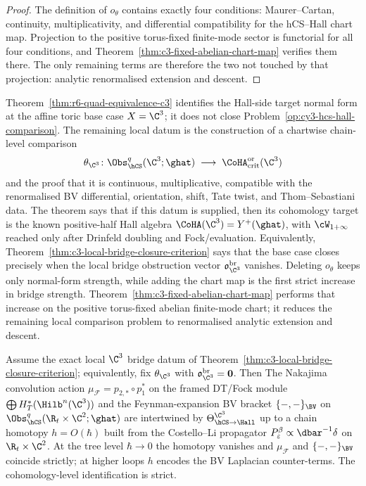 \begin{proof}
The definition of $o_\theta$ contains exactly four conditions:
Maurer--Cartan, continuity, multiplicativity, and differential
compatibility for the hCS--Hall chart map. Projection to the positive
torus-fixed finite-mode sector is functorial for all four conditions,
and Theorem~\ref{thm:c3-fixed-abelian-chart-map} verifies them there.
The only remaining terms are therefore the two not touched by that
projection: analytic renormalised extension and descent.
\end{proof}

\begin{remark}
\label{rem:r6-op-closed-at-c3}
Theorem~\ref{thm:r6-quad-equivalence-c3} identifies the Hall-side target
normal form at the affine toric base case $X=\C^3$; it does not close
Problem~\ref{op:cy3-hcs-hall-comparison}. The remaining local datum is
the construction of a chartwise chain-level comparison
\[
\theta_{\C^3}\colon
\Obs_{\hCS}^{q}(\C^3;\ghat)
\;\longrightarrow\;
\CoHA_{\mathrm{crit}}^{\mathrm{or}}(\C^3)
\]
and the proof that it is continuous, multiplicative, compatible with the
renormalised BV differential, orientation, shift, Tate twist, and
Thom--Sebastiani data. The theorem says that if this datum is supplied,
then its cohomology target is the known positive-half Hall algebra
$\CoHA(\C^3)=Y^+(\ghat)$, with $\cW_{1+\infty}$ reached only after
Drinfeld doubling and Fock/evaluation. Equivalently,
Theorem~\ref{thm:c3-local-bridge-closure-criterion} says that the base
case closes precisely when the local bridge obstruction vector
$\mathfrak o_{\C^3}^{\mathrm{br}}$ vanishes. Deleting \(o_{\theta}\)
keeps only normal-form strength, while
adding the chart map is the first strict increase in bridge strength.
Theorem~\ref{thm:c3-fixed-abelian-chart-map} performs that increase on
the positive torus-fixed abelian finite-mode chart; it reduces the
remaining local comparison problem to renormalised analytic extension
and descent.
\end{remark}

\begin{proposition}
\label{prop:r6-convolution-vs-bv-bracket}
Assume the exact local $\C^3$ bridge datum of
Theorem~\ref{thm:c3-local-bridge-closure-criterion}; equivalently, fix
$\theta_{\C^3}$ with
$\mathfrak o_{\C^3}^{\mathrm{br}}=\mathbf 0$. Then
The Nakajima convolution action
$\mu_{\mathcal F}=p_{2,*}\circ p_1^*$ on the framed DT/Fock module
$\bigoplus H^*_T(\Hilb^n(\C^3))$
and the Feynman-expansion BV bracket
$\{-,-\}_{\BV}$ on $\Obs_{\hCS}^{q}(\R_t\times\C^2;\ghat)$ are
intertwined by $\Theta^{\C^3}_{\hCS\to\Hall}$ up to a chain homotopy
$h=O(\hbar)$ built from the Costello--Li propagator
$P^\beta_\varepsilon\propto\dbar^{-1}\delta$ on $\R_t\times\C^2$.
At the tree level $\hbar\to 0$ the homotopy vanishes and
$\mu_{\mathcal F}$ and $\{-,-\}_{\BV}$ coincide strictly; at higher loops
$h$ encodes the BV Laplacian counter-terms. The cohomology-level
identification is strict.
\end{proposition}

